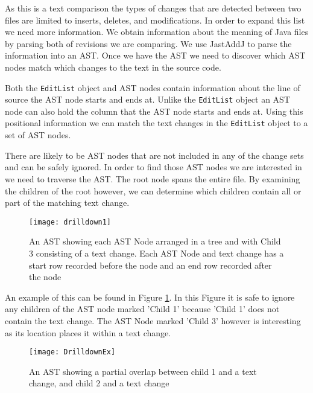 As this is a text comparison the types of changes that are detected between two files are limited to inserts, deletes, and modifications. 
In order to expand this list we need more information.  
We obtain information about the meaning of Java files by parsing both of revisions we are comparing.  
We use JastAddJ \cite{Oqvist2013} to parse the information into an AST. 
Once we have the AST we need to discover which AST nodes match which changes to the text in the source code.

\label{sec:over} 
Both the \lstinline{EditList} object and  AST nodes contain information about the line of source the AST node starts and ends at.  
Unlike the \lstinline{EditList} object an AST node can also hold the column that the AST node starts and ends at.  
Using this positional information we can match the text changes in the \lstinline{EditList} object to a set of AST nodes.

There are likely to be AST nodes that are not included in any of the change sets and can be safely ignored.
In order to find those AST nodes we are interested in we need to traverse the AST.
The root node spans the entire file. 
By examining the children of the root however, we can determine which children contain all or part of the matching text change.

\begin{figure}[!t]
 \begin{center}
  \texttt{[image: drilldown1]}
 \end{center}
 \caption{An AST showing each AST Node arranged in a tree and with Child 3 consisting of a text change.  Each AST Node and text change has a start row recorded before the node and an end row recorded after the node}
 \label{fig:findingASTNode}
\end{figure}

An example of this can be found in Figure \ref{fig:findingASTNode}.  In this Figure it is safe to ignore any children of the AST node marked 'Child 1' because 'Child 1' does not contain the text change.  The AST Node marked 'Child 3' however is interesting as its location places it within a text change. 


\begin{figure}[!t]
 \begin{center}
  \texttt{[image: DrilldownEx]}
 \end{center}
 \caption{An AST showing a partial overlap between child 1 and a text change, and child 2 and a text change}
 \label{fig:troubleASTNode}
\end{figure}

